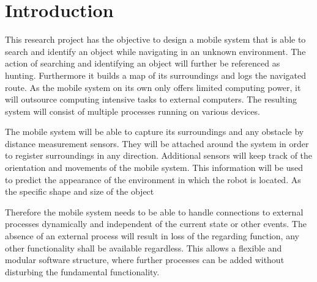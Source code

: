 \cleardoublepage
\pagestyle{fancy} %
\fancyhead{}
\fancyhf{}
\renewcommand{\headrulewidth}{0pt}
\renewcommand{\footrulewidth}{0.4pt}

\section{Introduction}

This research project has the objective to design a mobile system that is able to search and identify an object while navigating in an unknown environment. The action of searching and identifying an object will further be referenced as hunting. Furthermore it builds a map of its surroundings and logs the navigated route. As the mobile system on its own only offers limited computing power, it will outsource computing intensive tasks to external computers. The resulting system will consist of multiple processes running on various devices.

The mobile system will be able to capture its surroundings and any obstacle by distance measurement sensors. They will be attached around the system in order to register surroundings in any direction. Additional sensors will keep track of the orientation and movements of the mobile system. This information will be used to predict the appearance of the environment in which the robot is located. As the specific shape and size of the object 

Therefore the mobile system needs to be able to handle connections to external processes dynamically and independent of the current state or other events. The absence of an external process will result in loss of the regarding function, any other functionality shall be available regardless. This allows a flexible and modular software structure, where further processes can be added without disturbing the fundamental functionality.


